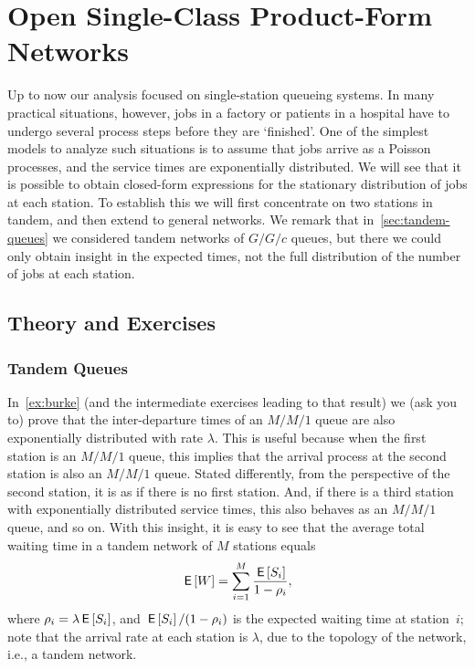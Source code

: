 \section{Open Single-Class Product-Form Networks}
\label{sec:jackson-networks}


Up to now our analysis focused on single-station queueing systems.
In many practical situations, however, jobs in a factory or patients in a hospital have to undergo several process steps before they are `finished'.
One of the simplest models to analyze such situations is to assume that jobs arrive as a Poisson processes, and the service times are exponentially distributed.
We will see that it is possible to obtain closed-form expressions for the stationary distribution of jobs at each station.
To establish this we will first concentrate on two stations in tandem, and then extend to general networks.
We remark that in~\cref{sec:tandem-queues} we considered tandem networks of $G/G/c$ queues, but there we could only obtain insight in the expected times, not the full distribution of the number of jobs at each station.

\subsection*{Theory and Exercises}




\subsubsection{Tandem Queues}

In~\cref{ex:burke} (and the intermediate exercises leading to that result) we (ask you to) prove that the inter-departure times of an $M/M/1$ queue are also exponentially distributed with rate $\lambda$.
This is useful because when the first station is an $M/M/1$ queue, this implies that the arrival process at the second station is also an $M/M/1$ queue.
Stated differently, from the perspective of the second station, it is as if there is no first station.
And, if there is a third station with exponentially distributed service times, this also behaves as an $M/M/1$ queue, and so on.
With this insight, it is easy to see that the average total waiting time in a tandem network of $M$ stations equals
\begin{equation*}
  \,\mathsf{E}\left[W\right] = \sum_{i=1}^M \frac{\,\mathsf{E}\left[S_i\right]}{1-\rho_i},
\end{equation*}
where $\rho_i = \lambda \,\mathsf{E}\left[S_i\right]$, and $\,\mathsf{E}\left[S_i\right]/(1-\rho_i)$ is the expected waiting time at station~$i$; note that the arrival rate at each station is $\lambda$, due to the topology of the network, i.e., a tandem network.

